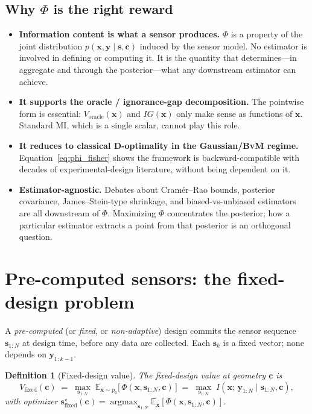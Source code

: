 \documentclass[11pt,a4paper]{article}
\newcommand{\E}{\mathbb{E}}
\newcommand{\argmax}{\operatorname{argmax}}
\newtheorem{definition}{Definition}
\begin{document}
\subsection{Why $\Phi$ is the right reward}

\begin{itemize}[nosep, leftmargin=2em]
  \item \textbf{Information content is what a sensor produces.}  $\Phi$ is a property of the joint distribution $p(\bm{x}, \bm{y} \mid \bm{s}, \bm{c})$ induced by the sensor model.  No estimator is involved in defining or computing it.  It is the quantity that determines---in aggregate and through the posterior---what any downstream estimator can achieve.
  \item \textbf{It supports the oracle / ignorance-gap decomposition.}  The pointwise form is essential: $V_{\mathrm{oracle}}(\bm{x})$ and $IG(\bm{x})$ only make sense as functions of $\bm{x}$.  Standard MI, which is a single scalar, cannot play this role.
  \item \textbf{It reduces to classical D-optimality in the Gaussian/BvM regime.}  Equation~\eqref{eq:phi_fisher} shows the framework is backward-compatible with decades of experimental-design literature, without being dependent on it.
  \item \textbf{Estimator-agnostic.}  Debates about Cram\'er--Rao bounds, posterior covariance, James--Stein-type shrinkage, and biased-vs-unbiased estimators are all downstream of $\Phi$.  Maximizing $\Phi$ concentrates the posterior; how a particular estimator extracts a point from that posterior is an orthogonal question.
\end{itemize}

\section{Pre-computed sensors: the fixed-design problem}
\label{sec:fixed}

A \emph{pre-computed} (or \emph{fixed}, or \emph{non-adaptive}) design commits the sensor sequence $\bm{s}_{1:N}$ at design time, before any data are collected.  Each $\bm{s}_k$ is a fixed vector; none depends on $\bm{y}_{1:k-1}$.

\begin{definition}[Fixed-design value]
\label{def:vfixed}
The fixed-design value at geometry $\bm{c}$ is
\begin{equation}
  V_{\mathrm{fixed}}(\bm{c}) \;=\; \max_{\bm{s}_{1:N}} \; \E_{\bm{x} \sim p_0}\bigl[\,\Phi(\bm{x}, \bm{s}_{1:N}, \bm{c})\,\bigr]
  \;=\; \max_{\bm{s}_{1:N}} \; I(\bm{x};\, \bm{y}_{1:N} \mid \bm{s}_{1:N}, \bm{c}),
  \label{eq:fixed}
\end{equation}
with optimizer $\bm{s}^\star_{\mathrm{fixed}}(\bm{c}) = \argmax_{\bm{s}_{1:N}} \E_{\bm{x}}[\Phi(\bm{x}, \bm{s}_{1:N}, \bm{c})]$.
\end{definition}
\end{document}
